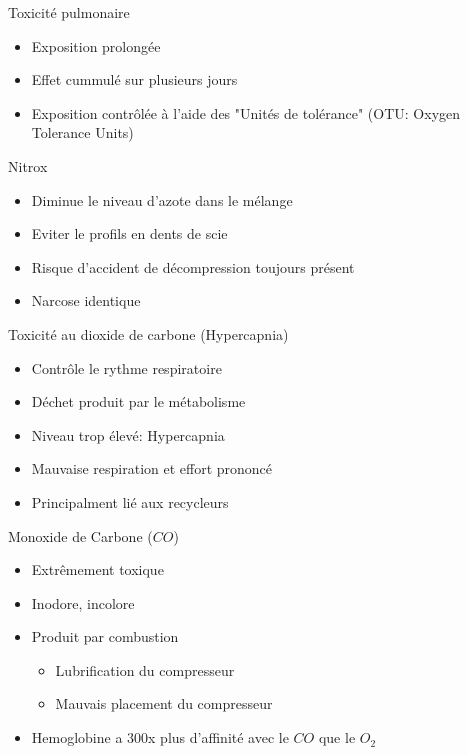 \begin{frame}{Toxicité pulmonaire}  
	\begin{itemize}
		\item Exposition prolongée
		\item Effet cummulé sur plusieurs jours
		\item Exposition contrôlée à l'aide des "Unités  de tolérance" (OTU: Oxygen Tolerance Units)
	\end{itemize}
\end{frame}

\begin{frame}{Nitrox}  
	\begin{itemize}
		\item Diminue le niveau d'azote dans le mélange
		\item Eviter le profils en dents de scie
		\item Risque d'accident de décompression toujours présent
		\item Narcose identique
	\end{itemize}
\end{frame}

\begin{frame}{Toxicité au dioxide de carbone (Hypercapnia)}  
	\begin{itemize}
		\item Contrôle le rythme respiratoire
		\item Déchet produit par le métabolisme
		\item Niveau trop élevé: Hypercapnia
		\item Mauvaise respiration et effort prononcé
		\item Principalment lié aux recycleurs
	\end{itemize}
\end{frame}

\begin{frame}{Monoxide de Carbone ($CO$)}
	\begin{itemize}
		\item Extrêmement toxique
		\item Inodore, incolore
		\item Produit par combustion
		\begin{itemize}
			\item Lubrification du compresseur
			\item Mauvais placement du compresseur
		\end{itemize}
		\item Hemoglobine a 300x plus d'affinité avec le $CO$ que le $O_2$
	\end{itemize}
\end{frame}